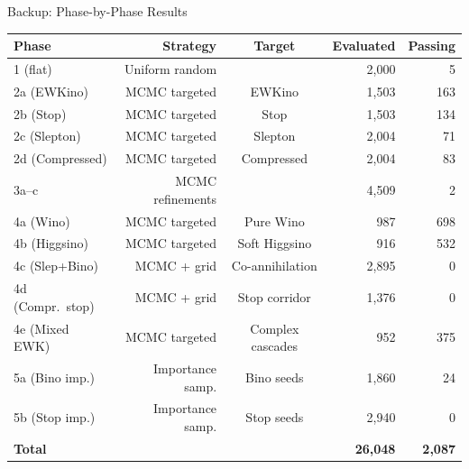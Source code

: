 \documentclass[aspectratio=169,10pt]{beamer}
\begin{document}
\begin{frame}[label=backup:phases]{Backup: Phase-by-Phase Results}
\begin{center}
\small
\begin{tabular}{lrcrr}
\toprule
\textbf{Phase} & \textbf{Strategy} & \textbf{Target} & \textbf{Evaluated} & \textbf{Passing} \\
\midrule
1 (flat)           & Uniform random    &                   & 2,000  & 5 \\
2a (EWKino)        & MCMC targeted     & EWKino            & 1,503  & 163 \\
2b (Stop)          & MCMC targeted     & Stop              & 1,503  & 134 \\
2c (Slepton)       & MCMC targeted     & Slepton           & 2,004  & 71 \\
2d (Compressed)    & MCMC targeted     & Compressed        & 2,004  & 83 \\
3a--c              & MCMC refinements  &                   & 4,509  & 2 \\
4a (Wino)          & MCMC targeted     & Pure Wino         & 987    & 698 \\
4b (Higgsino)      & MCMC targeted     & Soft Higgsino     & 916    & 532 \\
4c (Slep+Bino)     & MCMC + grid       & Co-annihilation   & 2,895  & 0 \\
4d (Compr.\ stop)  & MCMC + grid       & Stop corridor     & 1,376  & 0 \\
4e (Mixed EWK)     & MCMC targeted     & Complex cascades  & 952    & 375 \\
5a (Bino imp.)     & Importance samp.  & Bino seeds        & 1,860  & 24 \\
5b (Stop imp.)     & Importance samp.  & Stop seeds        & 2,940  & 0 \\
\midrule
\textbf{Total}     &                   &                   & \textbf{26,048} & \textbf{2,087} \\
\bottomrule
\end{tabular}
\end{center}
\end{frame}
\end{document}
